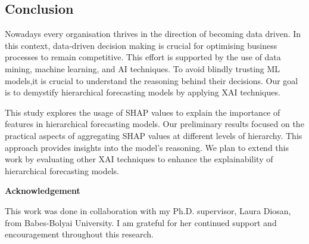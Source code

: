 \subsection{Conclusion}\label{subsec:conclusion}
Nowadays every organisation thrives in the direction of becoming data driven.
In this context, data-driven decision making is crucial for optimising business processes to remain competitive.
This effort is supported by the use of data mining, machine learning, and AI techniques.
To avoid blindly trusting ML models,it is crucial to understand the reasoning behind their decisions.
Our goal is to demystify hierarchical forecasting models by applying XAI techniques.

This study explores the usage of SHAP values to explain the importance of features in hierarchical forecasting models.
Our preliminary results focused on the practical aspects of aggregating SHAP values at different levels of
hierarchy. This approach provides insights into the model's reasoning.
We plan to extend this work by evaluating other XAI techniques to enhance the explainability of hierarchical forecasting models.


\textbf{Acknowledgement}

This work was done in collaboration with my Ph.D. supervisor, Laura Diosan, from Babes-Bolyai University.
I am grateful for her continued support and encouragement throughout this research.




